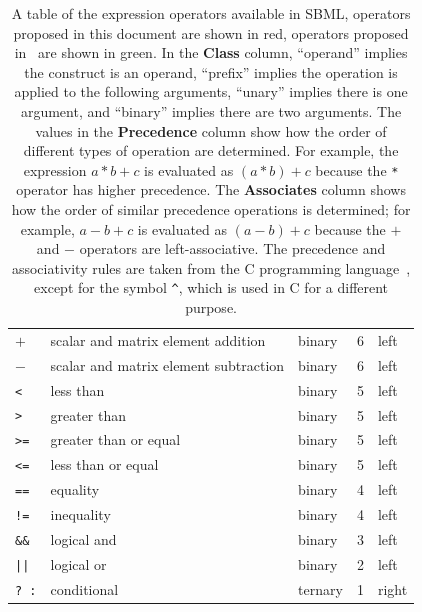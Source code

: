 \documentclass{cekarticle}
\begin{document}
\begin{table}[tbh]
\begin{center}
\begin{tabular}{lllcl}
      $+$ & scalar and matrix element addition & binary & 6 & left\\
      $-$ & scalar and matrix element subtraction & binary & 6 & left\\
      \color{green} \verb|<| & \color{green} less than & \color{green} binary & \color{green} 5 & \color{green} left\\
      \color{green} \verb|>| & \color{green} greater than & \color{green} binary & \color{green} 5 & \color{green} left\\
      \color{green} \verb|>=| & \color{green} greater than or equal & \color{green} binary & \color{green} 5 & \color{green} left\\
      \color{green} \verb|<=| & \color{green} less than or equal & \color{green} binary & \color{green} 5 & \color{green} left\\
      \color{green} \verb|==| & \color{green} equality & \color{green} binary & \color{green} 4 & \color{green} left\\
      \color{green} \verb|!=| & \color{green} inequality & \color{green} binary & \color{green} 4 & \color{green} left\\
      \color{green} \verb|&&| & \color{green} logical and & \color{green} binary & \color{green} 3 & \color{green} left\\
      \color{green} \verb+||+ & \color{green} logical or & \color{green} binary & \color{green} 2 & \color{green} left \\
      \color{green} \verb|? :| & \color{green} conditional & \color{green} ternary & \color{green} 1 & \color{green} right \color{black} \\
      \bottomrule
    \end{tabular}
  \end{center}
  \caption{A table of the expression operators available in SBML,
    operators proposed in this document are shown in red,
  operators proposed in~\citet{finney:2002c} are shown in green.
  In the \textbf{\textrm{Class}} column, ``operand'' implies the
  construct is an operand, ``prefix'' implies the operation is
  applied to the following arguments, ``unary'' implies there is
  one argument, and ``binary'' implies there are two arguments.
  The values in the \textbf{\textrm{Precedence}} column show how
  the order of different types of operation are determined.  For
  example, the expression $a * b + c$ is evaluated as $(a * b) +
  c$ because the \texttt{*} operator has higher precedence.  The
  \textbf{\textrm{Associates}} column shows how the order of
  similar precedence operations is determined; for example, $a -
  b + c$ is evaluated as $(a - b) + c$ because the $+$ and $-$
  operators are left-associative.  The precedence and
  associativity rules are taken from the C programming
  language~\protect\citep{harbison:1995}, except for the symbol
  \texttt{\^}, which is used in C for a different purpose.}
  \label{tab:operators}
\end{table}




\end{document}
